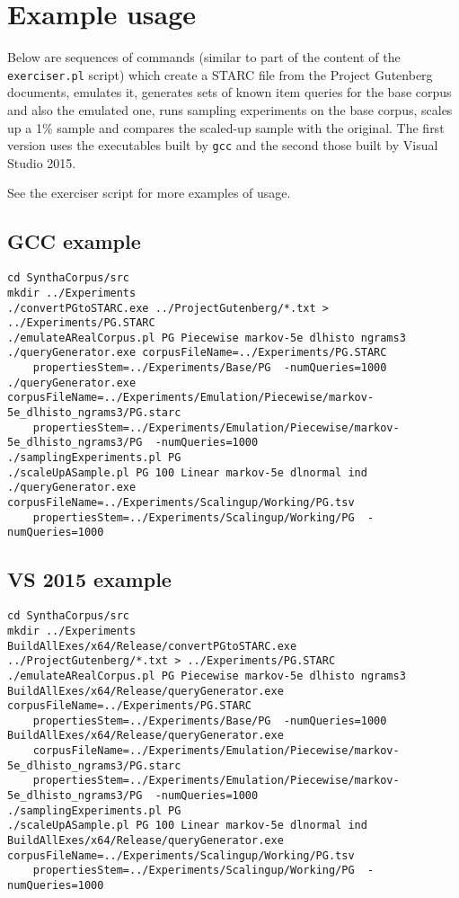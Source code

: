 \documentclass{article}
\begin{document}
\section{Example usage}

Below are sequences of commands (similar to part of the content of the
\texttt{exerciser.pl} script) which create a STARC file from the Project Gutenberg documents,
emulates it, generates sets of known item queries for the base corpus
and also the emulated one, runs sampling experiments on the base
corpus, scales up a 1\% sample and compares the scaled-up sample with
the original.   The first version uses the executables built by
\texttt{gcc} and the second those built by Visual Studio 2015.

See the exerciser script for more examples of usage.
 
\subsection{GCC example}

{\footnotesize
\begin{verbatim}
cd SynthaCorpus/src
mkdir ../Experiments
./convertPGtoSTARC.exe ../ProjectGutenberg/*.txt > ../Experiments/PG.STARC
./emulateARealCorpus.pl PG Piecewise markov-5e dlhisto ngrams3
./queryGenerator.exe corpusFileName=../Experiments/PG.STARC 
    propertiesStem=../Experiments/Base/PG  -numQueries=1000
./queryGenerator.exe corpusFileName=../Experiments/Emulation/Piecewise/markov-5e_dlhisto_ngrams3/PG.starc 
    propertiesStem=../Experiments/Emulation/Piecewise/markov-5e_dlhisto_ngrams3/PG  -numQueries=1000
./samplingExperiments.pl PG
./scaleUpASample.pl PG 100 Linear markov-5e dlnormal ind
./queryGenerator.exe corpusFileName=../Experiments/Scalingup/Working/PG.tsv 
    propertiesStem=../Experiments/Scalingup/Working/PG  -numQueries=1000

\end{verbatim}
}
\subsection{VS 2015 example}

{\footnotesize
\begin{verbatim}
cd SynthaCorpus/src
mkdir ../Experiments
BuildAllExes/x64/Release/convertPGtoSTARC.exe ../ProjectGutenberg/*.txt > ../Experiments/PG.STARC
./emulateARealCorpus.pl PG Piecewise markov-5e dlhisto ngrams3
BuildAllExes/x64/Release/queryGenerator.exe corpusFileName=../Experiments/PG.STARC 
    propertiesStem=../Experiments/Base/PG  -numQueries=1000
BuildAllExes/x64/Release/queryGenerator.exe 
    corpusFileName=../Experiments/Emulation/Piecewise/markov-5e_dlhisto_ngrams3/PG.starc 
    propertiesStem=../Experiments/Emulation/Piecewise/markov-5e_dlhisto_ngrams3/PG  -numQueries=1000
./samplingExperiments.pl PG
./scaleUpASample.pl PG 100 Linear markov-5e dlnormal ind
BuildAllExes/x64/Release/queryGenerator.exe corpusFileName=../Experiments/Scalingup/Working/PG.tsv 
    propertiesStem=../Experiments/Scalingup/Working/PG  -numQueries=1000

\end{verbatim}
}
\end{document}
